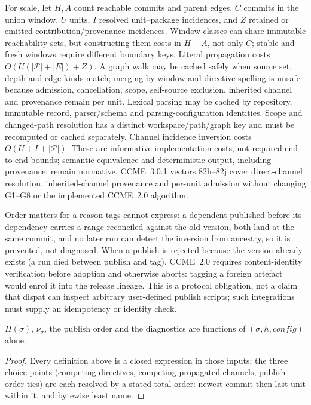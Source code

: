 \documentclass[sigconf,nonacm]{acmart}
\begin{document}
For scale, let $H,A$ count reachable commits and parent edges, $C$ commits in
the union window, $U$ units, $I$ resolved unit--package incidences, and $Z$
retained or emitted contribution/provenance incidences. Window classes can
share immutable reachability sets, but constructing them costs in $H+A$, not
only $C$; stable and fresh windows require different boundary keys.
Literal propagation costs $O(U(|\mathcal P|+|E|)+Z)$. A graph walk may be
cached safely when source set, depth and edge kinds match; merging by window and
directive spelling is unsafe because admission, cancellation, scope,
self-source exclusion, inherited channel and provenance remain per unit.
Lexical parsing may be cached by repository, immutable record, parser/schema
and parsing-configuration identities. Scope and changed-path resolution has a
distinct workspace/path/graph key and must be recomputed or cached separately.
Channel incidence inversion costs $O(U+I+|\mathcal P|)$. These are informative
implementation costs, not required end-to-end bounds; semantic equivalence and
deterministic output, including provenance, remain normative. CCME~3.0.1
vectors 82h--82j cover direct-channel resolution, inherited-channel provenance
and per-unit admission without changing
G1--G8 or the implemented CCME~2.0 algorithm.

Order matters for a reason tags cannot express: a dependent published
before its dependency carries a range reconciled against the old
version, both land at the same commit, and no later run can detect the
inversion from ancestry, so it is prevented, not diagnosed. When a
publish is rejected because the version already exists (a run died
between publish and tag), CCME~2.0 requires content-identity verification
before adoption and otherwise aborts: tagging a foreign artefact would enrol
it into the release lineage. This is a protocol obligation, not a claim that
dispat can inspect arbitrary user-defined publish scripts; such integrations
must supply an idempotency or identity check.

\begin{theorem}[determinism]
\label{thm:det}
$\Pi(\sigma)$, $\nu_\sigma$, the publish order and the diagnostics are
functions of $(\sigma, h, \mathit{config})$ alone.
\end{theorem}
\begin{proof}
Every definition above is a closed expression in those inputs; the three
choice points (competing directives, competing propagated channels,
publish-order ties) are each resolved by a stated total order: newest
commit then last unit within it, and bytewise least name.
\end{proof}
\end{document}
